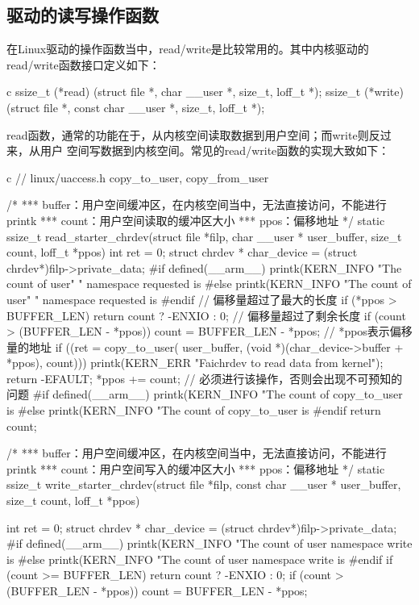 \subsection{驱动的读写操作函数}
在Linux驱动的操作函数当中，read/write是比较常用的。其中内核驱动的read/write函数接口定义如下：
\begin{code-block}{c}
ssize_t (*read) (struct file *, char __user *, size_t, loff_t *);
ssize_t (*write) (struct file *, const char __user *, size_t, loff_t *);
\end{code-block}
read函数，通常的功能在于，从内核空间读取数据到用户空间；而write则反过来，从用户
空间写数据到内核空间。常见的read/write函数的实现大致如下：
\begin{code-block}{c}
// linux/uaccess.h copy_to_user, copy_from_user

/*
*** buffer：用户空间缓冲区，在内核空间当中，无法直接访问，不能进行printk
*** count：用户空间读取的缓冲区大小
*** ppos：偏移地址
*/
static ssize_t read_starter_chrdev(struct file *filp,
        char __user * user_buffer, size_t count, loff_t *ppos)
{
        int ret = 0;
        struct chrdev * char_device = (struct chrdev*)filp->private_data;
#if defined(__arm__)
        printk(KERN_INFO "The count of user"
                        " namespace requested is %
#else
        printk(KERN_INFO "The count of user"
                        " namespace requested is %
#endif
        // 偏移量超过了最大的长度
        if (*ppos > BUFFER_LEN) {
                return count ? -ENXIO : 0;
        }
        // 偏移量超过了剩余长度
        if (count > (BUFFER_LEN - *ppos)) {
                count = BUFFER_LEN - *ppos;
        }
        // *ppos表示偏移量的地址
        if ((ret = copy_to_user(
                user_buffer, (void *)(char_device->buffer + *ppos), count))) {
                printk(KERN_ERR "Faichrdev to read data from kernel\n");
                return -EFAULT;
        }
        *ppos += count; // 必须进行该操作，否则会出现不可预知的问题
#if defined(__arm__)
        printk(KERN_INFO "The count of copy_to_user is %
#else
        printk(KERN_INFO "The count of copy_to_user is %
#endif
        return count;
}

/*
*** buffer：用户空间缓冲区，在内核空间当中，无法直接访问，不能进行printk
*** count：用户空间写入的缓冲区大小
*** ppos：偏移地址
*/
static ssize_t write_starter_chrdev(struct file *filp,
        const char __user * user_buffer, size_t count, loff_t *ppos)
{
        int ret = 0;
        struct chrdev * char_device = (struct chrdev*)filp->private_data;
#if defined(__arm__)
        printk(KERN_INFO
                "The count of user namespace write is %
#else
        printk(KERN_INFO
                "The count of user namespace write is %
#endif
        if (count >= BUFFER_LEN) {
                return count ? -ENXIO : 0;
        }
        if (count > (BUFFER_LEN - *ppos)) {
                count = BUFFER_LEN - *ppos;
        }

}
\end{code-block}
